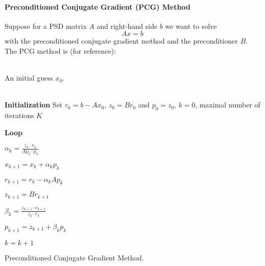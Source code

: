 \paragraph{Preconditioned Conjugate Gradient (PCG) Method}
Suppose for a PSD matrix $A$ and right-hand side $b$ we want to solve
\[
    Ax = b
\]
with the preconditioned conjugate gradient method and the preconditioner $B$. The PCG method is (for reference):
\begin{algorithm}[!h]
  \centering
    \begin{algorithmic}
      \Require \\
      An initial guess $x_0$. 

      \\
      \State \textbf{Initialization}
      Set $r_0 = b - Ax_0$, $z_0 = Br_0$ and $p_0=z_0$, $k=0$, maximal number of iterations $K$
      
      \State \textbf{Loop}
      
      
        $\alpha_k = \frac{z_k \cdot r_k}{Ap_k\cdot p_k}$

        $x_{k+1} = x_k + \alpha_k p_k$

        $r_{k+1} = r_k - \alpha_k Ap_k$

        $z_{k+1} = B r_{k+1}$

        $\beta_k = \frac{z_{k+1} \cdot r_{k+1}}{z_k \cdot r_k}$

        $p_{k+1} = z_{k+1} + \beta_k p_k$

        $k = k + 1$
      
      \EndFor
    \end{algorithmic}
    \caption{Preconditioned Conjugate Gradient Method.}
\end{algorithm}

